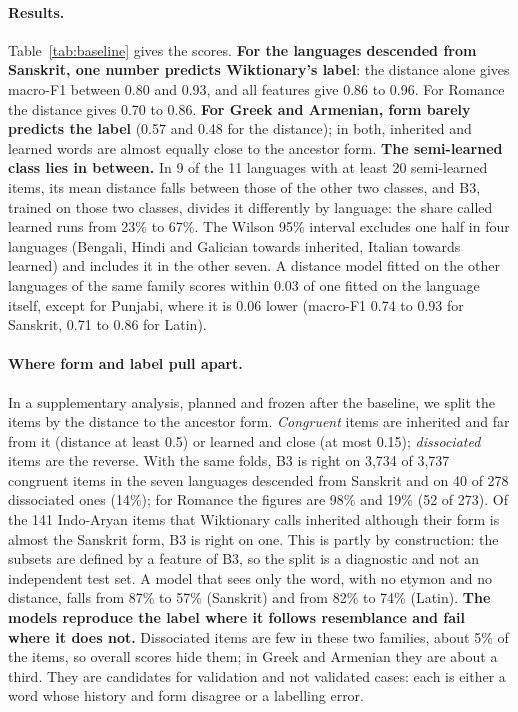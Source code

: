 \documentclass[11pt]{article}
\begin{document}
\paragraph{Results.} Table~\ref{tab:baseline} gives the scores. \textbf{For the languages descended from Sanskrit, one number predicts Wiktionary's label}: the distance alone gives macro-F1 between 0.80 and 0.93, and all features give 0.86 to 0.96. For Romance the distance gives 0.70 to 0.86. \textbf{For Greek and Armenian, form barely predicts the label} (0.57 and 0.48 for the distance); in both, inherited and learned words are almost equally close to the ancestor form. \textbf{The semi-learned class lies in between.} In 9 of the 11 languages with at least 20 semi-learned items, its mean distance falls between those of the other two classes, and B3, trained on those two classes, divides it differently by language: the share called learned runs from 23\% to 67\%. The Wilson 95\% interval excludes one half in four languages (Bengali, Hindi and Galician towards inherited, Italian towards learned) and includes it in the other seven. A distance model fitted on the other languages of the same family scores within 0.03 of one fitted on the language itself, except for Punjabi, where it is 0.06 lower (macro-F1 0.74 to 0.93 for Sanskrit, 0.71 to 0.86 for Latin).

\paragraph{Where form and label pull apart.} In a supplementary analysis, planned and frozen after the baseline, we split the items by the distance to the ancestor form. \textit{Congruent} items are inherited and far from it (distance at least 0.5) or learned and close (at most 0.15); \textit{dissociated} items are the reverse. With the same folds, B3 is right on 3,734 of 3,737 congruent items in the seven languages descended from Sanskrit and on 40 of 278 dissociated ones (14\%); for Romance the figures are 98\% and 19\% (52 of 273). Of the 141 Indo-Aryan items that Wiktionary calls inherited although their form is almost the Sanskrit form, B3 is right on one. This is partly by construction: the subsets are defined by a feature of B3, so the split is a diagnostic and not an independent test set. A model that sees only the word, with no etymon and no distance, falls from 87\% to 57\% (Sanskrit) and from 82\% to 74\% (Latin). \textbf{The models reproduce the label where it follows resemblance and fail where it does not.} Dissociated items are few in these two families, about 5\% of the items, so overall scores hide them; in Greek and Armenian they are about a third. They are candidates for validation and not validated cases: each is either a word whose history and form disagree or a labelling error.
\end{document}
